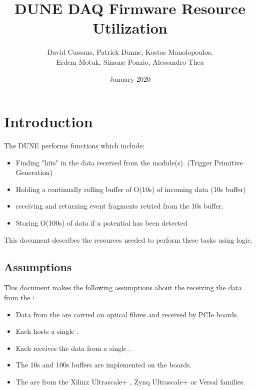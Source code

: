 \documentclass{article}
\title{DUNE DAQ Firmware Resource Utilization}
\author{David Cussans, Patrick Dunne, Kostas Manolopoulos,\\ Erdem Motuk, Simone Ponzio, Alessandro Thea}
\date{January 2020}
\begin{document}

\maketitle

\section{Introduction}

The DUNE  performs functions which include:

\begin{itemize}
  \item Finding "hits" in the data received from the \single module(s). (Trigger Primitive Generation)
  \item Holding a continually rolling buffer of O(10s) of incoming data (10s buffer)
  \item receiving  and returning event fragments retried from the 10s buffer.
  \item Storing O(100s) of data if a potential  has been detected
\end{itemize}

This document describes the resources needed to perform these tasks using  logic.

\subsection{Assumptions}

This document makes the following assumptions about the  receiving the data from the \single {}:

\begin{itemize}
  \item Data from the  are carried on optical fibres and received by  PCIe boards.
  \item Each  hosts a single .
  \item Each  receives the data from a single .
  \item The 10s and 100s buffers are implemented on the  boards.
  \item The  are from the Xilinx Ultrascale+ , Zynq Ultrascale+ or Versal  families.
\end{itemize}
\end{document}
